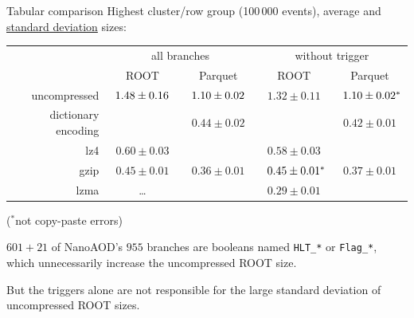 \documentclass[aspectratio=169]{beamer}
\begin{document}
\begin{frame}{Tabular comparison}
\vspace{0.25 cm}
Highest cluster/row group (100\,000 events), average and \underline{standard deviation} sizes:

\renewcommand{\arraystretch}{1.2}

\begin{center}
\begin{tabular}{r c c | c c}
                    & \multicolumn{2}{c}{all branches} & \multicolumn{2}{c}{without trigger} \\
                    & ROOT            & Parquet         & ROOT            & Parquet          \\\hline
uncompressed        & $^{\textcolor{white}{*}}1.48 \pm 0.16^{\textcolor{white}{*}}$ & $^{\textcolor{white}{*}}1.10 \pm 0.02^{\textcolor{white}{*}}$ & $1.32 \pm 0.11$ & $^{\textcolor{white}{*}}1.10 \pm 0.02^*$  \\
dictionary encoding &                 & $0.44 \pm 0.02$ &                 & $0.42 \pm 0.01$  \\
lz4                 & $0.60 \pm 0.03$ &                 & $0.58 \pm 0.03$ &                  \\
gzip                & $0.45 \pm 0.01$ & $0.36 \pm 0.01$ & $^{\textcolor{white}{*}}0.45 \pm 0.01^*$ & $0.37 \pm 0.01$  \\
lzma                & \ldots          &                 & $0.29 \pm 0.01$ &                  \\
\end{tabular}
\end{center}

\vspace{-0.1 cm}
\hfill {\scriptsize ($^*$not copy-paste errors)}

\vspace{0.2 cm}
$601+21$ of NanoAOD's $955$ branches are booleans named {\tt\small HLT\_*} or {\tt\small Flag\_*}, which unnecessarily increase the uncompressed ROOT size.

\vspace{0.2 cm}
But the triggers alone are not responsible for the large standard deviation of uncompressed ROOT sizes.
\end{frame}
\end{document}
